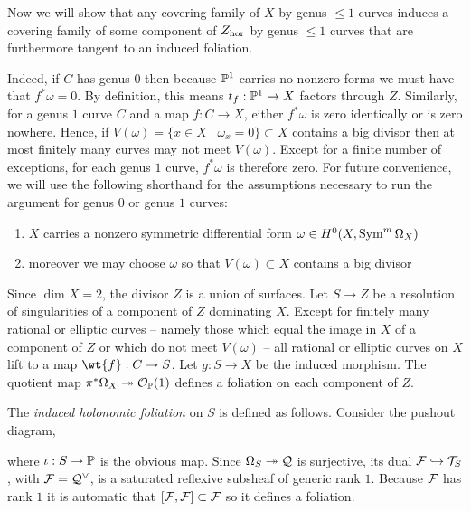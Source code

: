 \documentclass[main.tex]{subfiles}
\begin{document}
Now we will show that any covering family of $X$ by genus $\le 1$ curves induces a covering family of some component of $\Zhor$ by genus $\le 1$ curves that are furthermore tangent to an induced foliation.
\par 
Indeed, if $C$ has genus $0$ then because $\P^1$ carries no nonzero forms we must have that $f^* \omega = 0$. By definition, this means $t_f : \P^1 \to X$ factors through $Z$. %
Similarly, for a genus $1$ curve $C$ and a map $f : C \to X$, either $f^* \omega$ is zero identically or is zero nowhere. Hence, if $V(\omega) = \{x \in X \mid \omega_x = 0\} \subset X$ contains a big divisor then at most finitely many curves may not meet $V(\omega)$. Except for a finite number of exceptions, for each genus $1$ curve, $f^* \omega$ is therefore zero. For future convenience, we will use the following shorthand for the assumptions necessary to run the argument for genus $0$ or genus $1$ curves:
\begin{enumerate}
\item[$(\ast)_0$] $X$ carries a nonzero symmetric differential form $\omega \in H^0(X, \Sym^m \Omega_X)$
\item[$(\ast)_1$] moreover we may choose $\omega$ so that $V(\omega) \subset X$ contains a big divisor
\end{enumerate}
\par 
Since $\dim{X} = 2$, the divisor $Z$ is a union of surfaces. Let $S \to Z$ be a resolution of singularities of a component of $Z$ dominating $X$. Except for finitely many rational or elliptic curves -- namely those which equal the image in $X$ of a component of $Z$ or which do not meet $V(\omega)$ -- all rational or elliptic curves on $X$ lift to a map $\wt{f} : C \to S$. Let $g : S \to X$ be the induced morphism. The quotient map $\pi^* \Omega_X \onto \cO_{\P}(1)$ defines a foliation on each component of $Z$. 

\begin{defn}
The \textit{induced holonomic foliation} on $S$ is defined as follows. Consider the pushout diagram,
\begin{center}
\end{center}
where $\iota : S \to \P$ is the obvious map. Since $\Omega_{S} \onto \cQ$ is surjective, its dual $\F \embed \T_{S}$, with $\F = \cQ^{\vee}$, is a saturated reflexive subsheaf of generic rank $1$. Because $\F$ has rank $1$ it is automatic that $[\F, \F] \subset \F$ so it defines a foliation.  
\end{defn}
\end{document}
